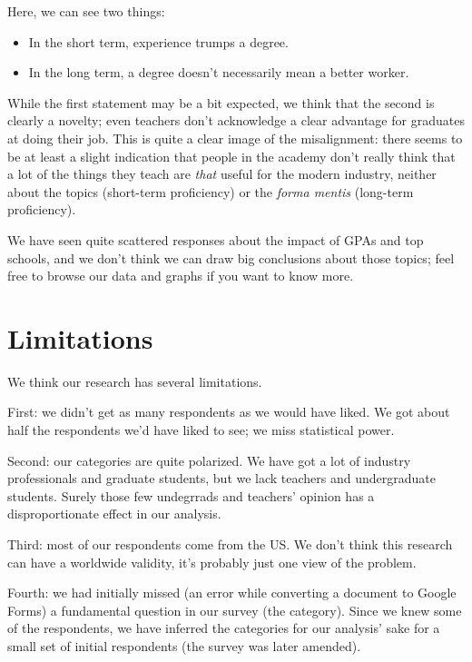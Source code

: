 \documentclass{sigchi}
\begin{document}
Here, we can see two things:
\begin{itemize}
\item In the short term, experience trumps a degree.
\item In the long term, a degree doesn't necessarily mean a better worker.	
\end{itemize}

While the first statement may be a bit expected, we think that the second is clearly a novelty; even teachers don't acknowledge a clear advantage for graduates at doing their job. This is quite a clear image of the misalignment: there seems to be at least a slight indication that people in the academy don't really think that a lot of the things they teach are \textit{that} useful for the modern industry, neither about the topics (short-term proficiency) or the \textit{forma mentis} (long-term proficiency).


We have seen quite scattered responses about the impact of GPAs and top schools, and we don't think we can draw big conclusions about those topics; feel free to browse our data and graphs if you want to know more.
  
 \section{Limitations}
 We think our research has several limitations.\newline

First: we didn't get as many respondents as we would have liked. We got about half the respondents we'd have liked to see; we miss statistical power.\newline

Second: our categories are quite polarized. We have got a lot of industry professionals and graduate students, but we lack teachers and undergraduate students. Surely those few undegrrads and teachers' opinion has a disproportionate effect in our analysis. \newline

Third: most of our respondents come from the US. We don't think this research can have a worldwide validity, it's probably just one view of the problem.\newline

Fourth: we had initially missed (an error while converting a document to Google Forms) a fundamental question in our survey (the category). Since we knew some of the respondents, we have inferred the categories for our analysis' sake for a small set of initial respondents (the survey was later amended).\newline
\end{document}
